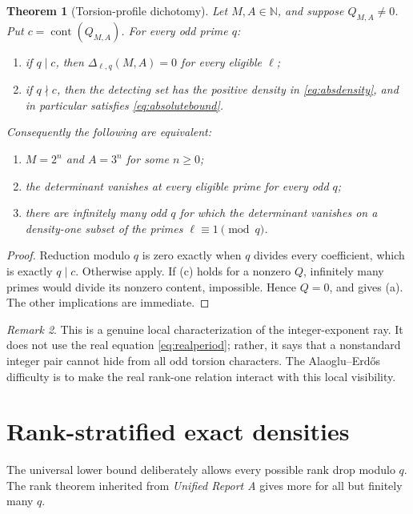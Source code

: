 \documentclass[11pt]{article}
\numberwithin{equation}{section}
\newtheorem{theorem}{Theorem}[section]
\theoremstyle{definition}
\theoremstyle{remark}
\newtheorem{remark}[theorem]{Remark}
\newcommand{\N}{\mathbb N}
\newcommand{\cont}{\operatorname{cont}}
\newcommand{\ReportA}{\textit{Unified Report A}}
\begin{document}
\begin{theorem}[Torsion-profile dichotomy]
\label{thm:profile}
Let \(M,A\in\N\), and suppose \(Q_{M,A}\ne0\).  Put \(c=\cont(Q_{M,A})\).  For every odd
prime \(q\):
\begin{enumerate}
\item if \(q\mid c\), then \(\Delta_{\ell,q}(M,A)=0\) for every eligible \(\ell\);
\item if \(q\nmid c\), then the detecting set has the positive density in
\eqref{eq:absdensity}, and in particular satisfies \eqref{eq:absolutebound}.
\end{enumerate}
Consequently the following are equivalent:
\begin{enumerate}[label=(\alph*)]
\item \(M=2^n\) and \(A=3^n\) for some \(n\ge0\);
\item the determinant vanishes at every eligible prime for every odd \(q\);
\item there are infinitely many odd \(q\) for which the determinant vanishes on a density-one
subset of the primes \(\ell\equiv1\pmod q\).
\end{enumerate}
\end{theorem}

\begin{proof}
Reduction modulo \(q\) is zero exactly when \(q\) divides every coefficient, which is exactly
\(q\mid c\).  Otherwise  apply.  If (c) holds for a
nonzero \(Q\), infinitely many primes would divide its nonzero content, impossible.  Hence
\(Q=0\), and  gives (a).  The other implications are immediate.
\end{proof}

\begin{remark}
This is a genuine local characterization of the integer-exponent ray.  It does not use the
real equation \eqref{eq:realperiod}; rather, it says that a nonstandard integer pair cannot
hide from all odd torsion characters.  The Alaoglu--Erd\H{o}s difficulty is to make the real
rank-one relation interact with this local visibility.
\end{remark}

\section{Rank-stratified exact densities}
\label{sec:rankdensity}

The universal lower bound deliberately allows every possible rank drop modulo \(q\).  The
rank theorem inherited from \ReportA{} gives more for all but finitely many \(q\).
\end{document}
